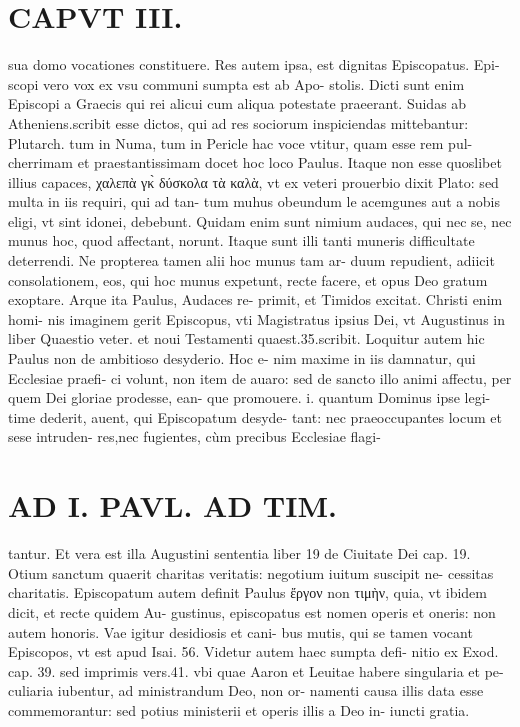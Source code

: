 \documentclass{article}
\begin{document}
\begin{pages}
\section*{CAPVT  III. }
\marginpar{[ p.99 ]}\pstart sua domo vocationes constituere.  \pend\pstart Res autem ipsa, est dignitas Episcopatus. Epi- scopi vero vox ex vsu communi sumpta est ab Apo- stolis. Dicti sunt enim Episcopi a Graecis qui rei alicui cum aliqua potestate praeerant. Suidas ab Atheniens.scribit esse dictos, qui ad res sociorum inspiciendas mittebantur: Plutarch. tum in Numa, tum in Pericle hac voce vtitur, quam esse rem pul- cherrimam et praestantissimam docet hoc loco Paulus. Itaque non esse quoslibet illius capaces, χαλεπὰ γκ̀ δύσκολα τὰ καλὰ, vt ex veteri prouerbio dixit Plato: sed multa in iis requiri, qui ad tan- tum muhus obeundum le acemgunes aut a nobis eligi, vt sint idonei, debebunt. Quidam enim sunt nimium audaces, qui nec se, nec munus hoc, quod affectant, norunt. Itaque sunt illi tanti muneris difficultate deterrendi.  \pend\pstart Ne propterea tamen alii hoc munus tam ar- duum repudient, adiicit consolationem, eos, qui hoc munus expetunt, recte facere, et opus Deo gratum exoptare. Arque ita Paulus, Audaces re- primit, et Timidos excitat. Christi enim homi- nis imaginem gerit Episcopus, vti Magistratus ipsius Dei, vt Augustinus in liber  Quaestio veter. et noui Testamenti quaest.35.scribit. Loquitur autem hic Paulus non de ambitioso desyderio. Hoc e- nim maxime in iis damnatur, qui Ecclesiae praefi- ci volunt, non item de auaro: sed de sancto illo animi affectu, per quem Dei gloriae prodesse, ean- que promouere. i. quantum Dominus ipse legi- time dederit, auent, qui Episcopatum desyde- tant: nec praeoccupantes locum et sese intruden- res,nec fugientes, cùm precibus Ecclesiae flagi-  \pend
\section*{AD I. PAVL. AD TIM. }
\marginpar{[ p.100 ]}\pstart tantur. Et vera est illa Augustini sententia liber 19 de Ciuitate Dei cap. 19. Otium sanctum quaerit charitas veritatis: negotium iuitum suscipit ne- cessitas charitatis.  \pend\pstart Episcopatum autem definit Paulus ἔργον non τιμὴν, quia, vt ibidem dicit, et recte quidem Au- gustinus, episcopatus est nomen operis et oneris: non autem honoris. Vae igitur desidiosis et cani- bus mutis, qui se tamen vocant Episcopos, vt est apud Isai. 56. Videtur autem haec sumpta defi- nitio ex Exod. cap. 39. sed imprimis vers.41. vbi quae Aaron et Leuitae habere singularia et pe- culiaria iubentur, ad ministrandum Deo, non or- namenti causa illis data esse commemorantur: sed potius ministerii et operis illis a Deo in- iuncti gratia.  \pend
{}
{}

\end{pages}
\end{document}
